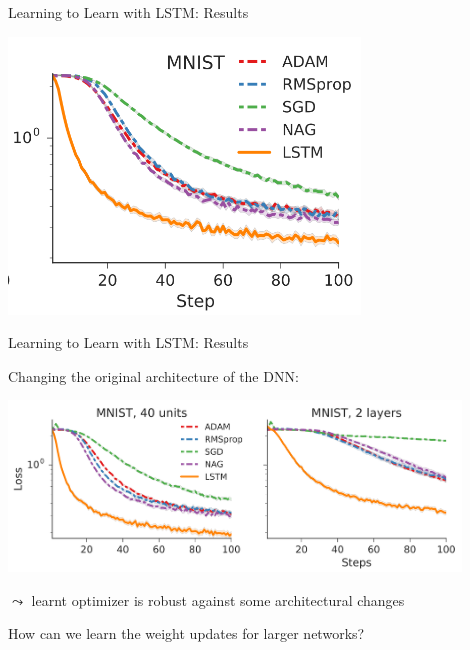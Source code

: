 \begin{frame}[c]{Learning to Learn with LSTM: Results }

\centering
\includegraphics[width=0.7\textwidth]{images/l2l_mnist_base}

\end{frame}
\begin{frame}[c]{Learning to Learn with LSTM: Results }

Changing the original architecture of the DNN:
\smallskip

\centering
\includegraphics[width=0.9\textwidth]{images/l2l_mnist_okchange}

$\leadsto$ learnt optimizer is robust against some architectural changes

\pause
\smallskip
How can we learn the weight updates for larger networks? \hands

\end{frame}
